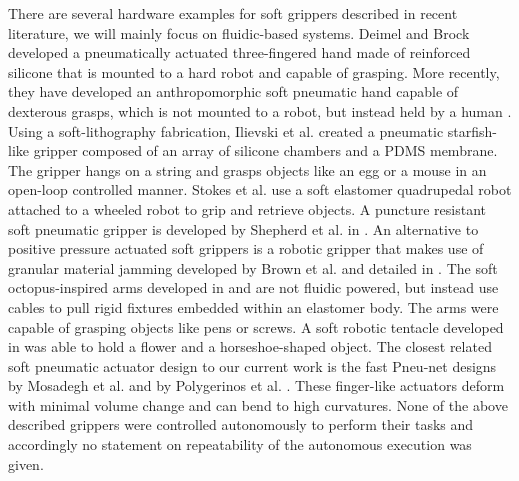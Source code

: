 There are several hardware examples for soft grippers described in recent literature, we will mainly focus on fluidic-based systems.
Deimel and Brock \cite{deimel2013compliant} developed a pneumatically actuated three-fingered hand made of reinforced silicone that is mounted to a hard robot and capable of grasping.
More recently, they have developed an anthropomorphic soft pneumatic hand capable of dexterous grasps, which is not mounted to a robot, but instead held by a human \cite{deimel2014novel}. 
Using a soft-lithography fabrication, Ilievski et al. \cite{ilievski2011soft} created a pneumatic starfish-like gripper composed of an array of silicone chambers and a PDMS membrane. 
The gripper hangs on a string and grasps objects like an egg or a mouse in an open-loop controlled manner. 
Stokes et al. \cite{Stokes2014hybrid} use a soft elastomer quadrupedal robot attached to a wheeled robot to grip and retrieve objects. 
A puncture resistant soft pneumatic gripper is developed by Shepherd et al. in \cite{shepherd2013soft}. 
An alternative to positive pressure actuated soft grippers is a robotic gripper that makes use of granular material jamming developed by Brown et al. and detailed in \cite{brown2010universal}.
The soft octopus-inspired arms developed in \cite{calisti2010study} and \cite{calisti2011octopus} are not fluidic powered, but instead use cables to pull rigid fixtures embedded within an elastomer body. 
The arms were capable of grasping objects like pens or screws.
A soft robotic tentacle developed in \cite{martinez2013robotic} was able to hold a flower and a horseshoe-shaped object.
The closest related soft pneumatic actuator design to our current work is the fast Pneu-net designs by Mosadegh et al. \cite{mosadegh2014pneumatic} and by Polygerinos et al. \cite{polygerinos2013towards}.
These finger-like actuators deform with minimal volume change and can bend to high curvatures.
None of the above described grippers were controlled autonomously to perform their tasks and accordingly no statement on repeatability of the autonomous execution was given. 

